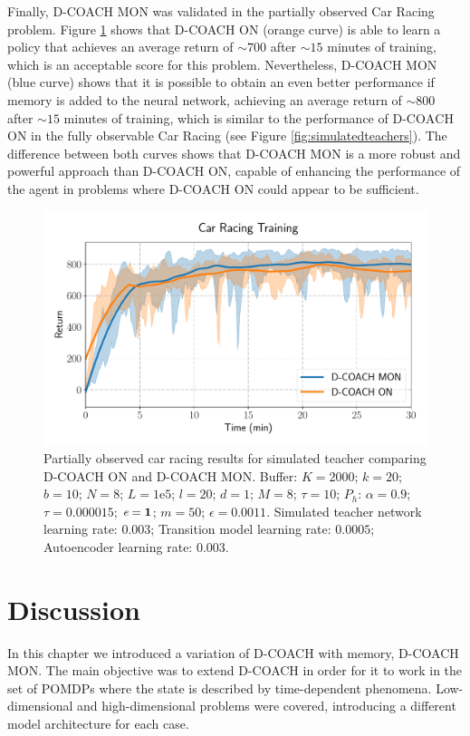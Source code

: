 Finally, D-COACH MON was validated in the partially observed Car Racing problem. Figure \ref{fig:po_cr} shows that D-COACH ON (orange curve) is able to learn a policy that achieves an average return of $\sim700$ after $\sim15$ minutes of training, which is an acceptable score for this problem. Nevertheless, D-COACH MON (blue curve) shows that it is possible to obtain an even better performance if memory is added to the neural network, achieving an average return of $\sim800$ after $\sim15$ minutes of training, which is similar to the performance of $\text{D-COACH}$ ON in the fully observable Car Racing (see Figure \ref{fig:simulatedteachers}). The difference between both curves shows that D-COACH MON is a more robust and powerful approach than $\text{D-COACH}$ ON, capable of enhancing the performance of the agent in problems where $\text{D-COACH}$ ON could appear to be sufficient.

\begin{figure}[h]
    \centering
    \includegraphics[width=0.8\linewidth]{imagenes/cap3/car_racing_lstm.pdf}
    \caption{Partially observed car racing results for simulated teacher comparing D-COACH ON and D-COACH MON.  Buffer: $K = 2000$; $k=20$; $b=10$; $N = 8$; $L=1\mathrm{e}5$; $l=20$; $d=1$; $M=8$; $\tau=10$; $P_{h}$: $\alpha = 0.9$; $\tau = 0.000015$; $\emph{e}=\textbf{1}$; $m=50$; $\epsilon=0.0011$. Simulated teacher network learning rate: $0.003$; Transition model learning rate: $0.0005$; Autoencoder learning rate: $0.003$.}
    \label{fig:po_cr}
\end{figure}

\section{Discussion}
In this chapter we introduced a variation of D-COACH with memory, D-COACH MON. The main objective was to extend D-COACH in order for it to work in the set of POMDPs where the state is described by time-dependent phenomena. Low-dimensional and high-dimensional problems were covered, introducing a different model architecture for each case. 

